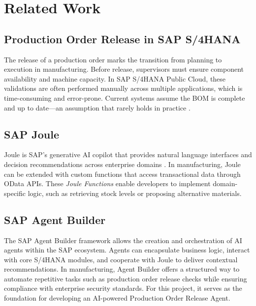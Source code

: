 \chapter{Related Work}
\label{chap:RelatedWork}

\section{Production Order Release in SAP S/4HANA}
The release of a production order marks the transition from planning to execution in manufacturing. Before release, supervisors must ensure component availability and machine capacity. In SAP S/4HANA Public Cloud, these validations are often performed manually across multiple applications, which is time-consuming and error-prone. Current systems assume the BOM is complete and up to date—an assumption that rarely holds in practice \cite{sapprodrelease2025}.

\section{SAP Joule}
Joule is SAP's generative AI copilot that provides natural language interfaces and decision recommendations across enterprise domains \cite{sapjoule2025}. In manufacturing, Joule can be extended with custom functions that access transactional data through OData APIs. These \emph{Joule Functions} enable developers to implement domain-specific logic, such as retrieving stock levels or proposing alternative materials.

\section{SAP Agent Builder}
The SAP Agent Builder \cite{sapagentbuilder2025} framework allows the creation and orchestration of AI agents within the SAP ecosystem. Agents can encapsulate business logic, interact with core S/4HANA modules, and cooperate with Joule to deliver contextual recommendations. In manufacturing, Agent Builder offers a structured way to automate repetitive tasks such as production order release checks while ensuring compliance with enterprise security standards. For this project, it serves as the foundation for developing an AI-powered Production Order Release Agent.